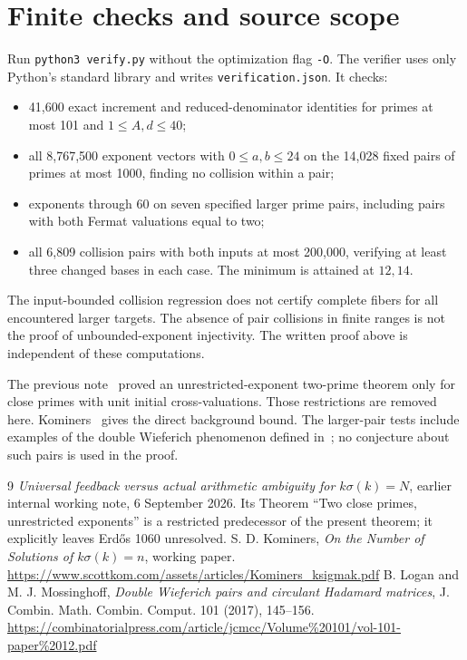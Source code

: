 \documentclass[11pt]{article}
\begin{document}
\section{Finite checks and source scope}
Run \texttt{python3 verify.py} without the optimization flag \texttt{-O}. The verifier uses only Python's standard library and writes \texttt{verification.json}. It checks:
\begin{itemize}
\item 41,600 exact increment and reduced-denominator identities for primes at most 101 and $1\le A,d\le40$;
\item all 8,767,500 exponent vectors with $0\le a,b\le24$ on the 14,028 fixed pairs of primes at most 1000, finding no collision within a pair;
\item exponents through 60 on seven specified larger prime pairs, including pairs with both Fermat valuations equal to two;
\item all 6,809 collision pairs with both inputs at most 200,000, verifying at least three changed bases in each case. The minimum is attained at $12,14$.
\end{itemize}
The input-bounded collision regression does not certify complete fibers for all encountered larger targets. The absence of pair collisions in finite ranges is not the proof of unbounded-exponent injectivity. The written proof above is independent of these computations.

The previous note~\cite{prior} proved an unrestricted-exponent two-prime theorem only for close primes with unit initial cross-valuations. Those restrictions are removed here. Kominers~\cite{kominers} gives the direct background bound. The larger-pair tests include examples of the double Wieferich phenomenon defined in~\cite{wieferich}; no conjecture about such pairs is used in the proof.

\begin{thebibliography}{9}
 \emph{Universal feedback versus actual arithmetic ambiguity for $k\sigma(k)=N$}, earlier internal working note, 6 September 2026. Its Theorem ``Two close primes, unrestricted exponents'' is a restricted predecessor of the present theorem; it explicitly leaves Erd\H{o}s 1060 unresolved.
 S. D. Kominers, \emph{On the Number of Solutions of $k\sigma(k)=n$}, working paper.\newline
\url{https://www.scottkom.com/assets/articles/Kominers_ksigmak.pdf}
 B. Logan and M. J. Mossinghoff, \emph{Double Wieferich pairs and circulant Hadamard matrices}, J. Combin. Math. Combin. Comput. 101 (2017), 145--156.\newline
\url{https://combinatorialpress.com/article/jcmcc/Volume\%20101/vol-101-paper\%2012.pdf}
\end{thebibliography}
\end{document}
